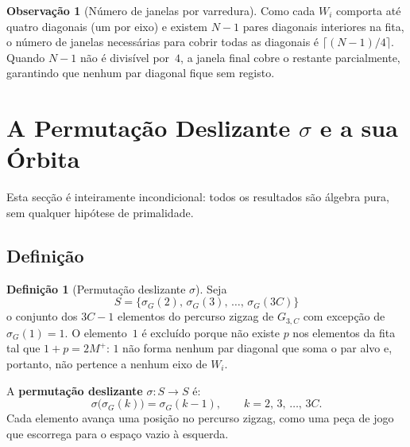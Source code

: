 \documentclass[12pt, a4paper]{article}
\theoremstyle{plain}
\theoremstyle{definition}
\newtheorem{definition}[theorem]{Definição}
\newtheorem{remark}[theorem]{Observação}
\theoremstyle{remark}
\begin{document}
	\begin{remark}[Número de janelas por varredura]
		Como cada $W_i$ comporta até quatro diagonais (um por eixo) e
		existem $N-1$ pares diagonais interiores na fita, o número de
		janelas necessárias para cobrir todas as diagonais é
		$\lceil(N-1)/4\rceil$.  Quando $N-1$ não é divisível por~$4$,
		a janela final cobre o restante parcialmente, garantindo que
		nenhum par diagonal fique sem registo.
	\end{remark}
	
	\section{A Permutação Deslizante $\sigma$ e a sua Órbita}
	\label{sec:sigma}
	
	Esta secção é inteiramente incondicional: todos os resultados são
	álgebra pura, sem qualquer hipótese de primalidade.
	
	\subsection{Definição}
	
	\begin{definition}[Permutação deslizante $\sigma$]
		\label{def:sigma}
		Seja
		\[
		S = \bigl\{\sigma_G(2),\,\sigma_G(3),\,\ldots,\,
		\sigma_G(3C)\bigr\}
		\]
		o conjunto dos $3C-1$ elementos do percurso zigzag de $G_{3,C}$
		com excepção de $\sigma_G(1)=1$.  O elemento~$1$ é excluído
		porque não existe $p$ nos elementos da fita tal que $1+p=2M^+$:
		$1$ não forma nenhum par diagonal que soma o par alvo e,
		portanto, não pertence a nenhum eixo de $W_i$.
		
		A \textbf{permutação deslizante} $\sigma:S\to S$ é:
		\[
		\sigma\bigl(\sigma_G(k)\bigr) = \sigma_G(k-1),
		\qquad k = 2,\,3,\,\ldots,\,3C.
		\]
		Cada elemento avança uma posição no percurso zigzag, como uma
		peça de jogo que escorrega para o espaço vazio à esquerda.
	\end{definition}
	
\end{document}
